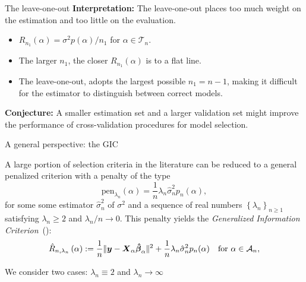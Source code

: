 \documentclass{beamer}
\newcommand{\0}{\emptyset}
\newcommand{\paren}[1]{\left(#1 \right)}
\newcommand{\set}[1]{\left\{ #1 \right\}}
\newcommand{\norm}[1]{|\hspace{-1pt}|#1 |\hspace{-1pt}|}
\newcommand{\normsq}[1]{\norm{#1}^{2}}
\newcommand{\Acal}{\mathcal{A}_{n}}
\newcommand{\Tcal}{\mathcal{T}_{n}}
\newcommand{\X}{\boldsymbol{X}}
\newcommand{\y}{\boldsymbol{y}}
\newcommand{\bbetahat}{\boldsymbol{\hat{\beta}}}
\newcommand{\Rhat}[2]{\hat{R}_{n, #1}\paren{#2}}
\newcommand{\sigmahat}{\hat{\sigma}^{2}_{n}}
\newcommand{\1}{\mathmybb{1}}
\begin{document}
\begin{frame}{The leave-one-out}
    \textbf{Interpretation: } The leave-one-out places too much weight on the estimation and too little on the evaluation.
    \begin{itemize}
        \item \(R_{n_{1}}(\alpha) = \sigma^{2}p(\alpha)/n_{1}\) for \(\alpha\in\Tcal\).
        \item The larger \(n_{1}\), the closer \(R_{n_{1}}(\alpha)\) is to a flat line.
        \item The leave-one-out, adopts the largest possible \(n_{1}= n-1\), making it difficult for the estimator to distinguish between correct models.
      \end{itemize}  

    \textbf{Conjecture: } A smaller estimation set and a larger validation set might improve the performance of cross-validation procedures for model selection.
\end{frame}

\begin{frame}{A general perspective: the GIC}
  
    A large portion of selection criteria in the literature can be reduced to a general penalized criterion with a penalty of the type 
    \[\mathrm{pen}_{\lambda_{n}}(\alpha) = \frac{1}{n} \lambda_{n} \sigmahat p_{n}(\alpha),\]
    for some some estimator \(\sigmahat\) of \(\sigma^{2}\) and a sequence of real numbers \(\set{\lambda_{n}}_{n\geq 1}\) satisfying \(\lambda_{n}\geq 2\) and \(\lambda_{n}/n\to 0\). This penalty yields the \alert{\emph{Generalized Information Criterion}}~(\cite{shao_1997}):
    \[\Rhat{\lambda_{n}}{\alpha} := \frac{1}{n}\normsq{\y - \X_{\alpha}\bbetahat_{\alpha}} + \frac{1}{n}\lambda_{n}\sigmahat p_{n}(\alpha)\quad\text{for }\alpha\in\Acal,\]

    We consider two cases: \(\lambda_{n}\equiv 2\) and \(\lambda_{n}\to\infty\)
\end{frame}
\end{document}
